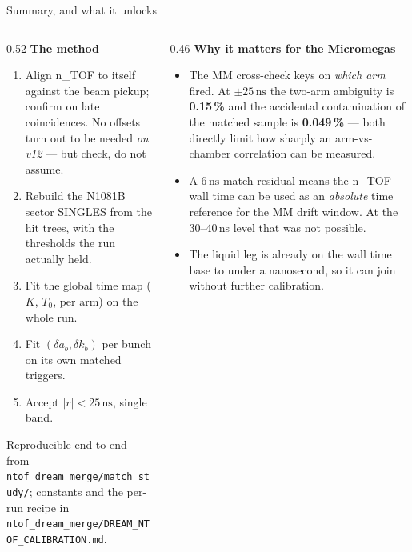 \documentclass[aspectratio=169,10pt]{beamer}
\newcommand{\ns}{\,\mathrm{ns}}
\newcommand{\gd}[1]{\textcolor{green!35!black}{\textbf{#1}}}
\newcommand{\ntof}{n\_TOF}
\begin{document}
\begin{frame}{Summary, and what it unlocks}
\begin{columns}[T]
\begin{column}{0.52\textwidth}
\textbf{The method}
\begin{enumerate}\setlength\itemsep{0.2em}
  \item Align \ntof{} to itself against the beam pickup; confirm on late
        coincidences. No offsets turn out to be needed \emph{on v12} --- but
        check, do not assume.
  \item Rebuild the N1081B sector SINGLES from the hit trees, with the
        thresholds the run actually held.
  \item Fit the global time map ($K$, $T_0$, per arm) on the whole run.
  \item Fit $(\delta a_b,\delta k_b)$ per bunch on its own matched triggers.
  \item Accept $|r|<25\ns$, single band.
\end{enumerate}
\vspace{0.3em}
\footnotesize
Reproducible end to end from \texttt{ntof\_dream\_merge/match\_study/};
constants and the per-run recipe in
\texttt{ntof\_dream\_merge/DREAM\_NTOF\_CALIBRATION.md}.
\end{column}
\begin{column}{0.46\textwidth}
\textbf{Why it matters for the Micromegas}
\begin{itemize}\setlength\itemsep{0.3em}
  \item The MM cross-check keys on \emph{which arm} fired. At $\pm25\ns$ the
        two-arm ambiguity is \gd{0.15\,\%} and the accidental contamination of
        the matched sample is \gd{0.049\,\%} --- both directly limit how sharply
        an arm-vs-chamber correlation can be measured.
  \item A \gd{$6\ns$} match residual means the \ntof{} wall time can be used as
        an \emph{absolute} time reference for the MM drift window. At the
        30--40\,ns level that was not possible.
  \item The liquid leg is already on the wall time base to under a nanosecond,
        so it can join without further calibration.
\end{itemize}
\end{column}
\end{columns}
\end{frame}
\end{document}
